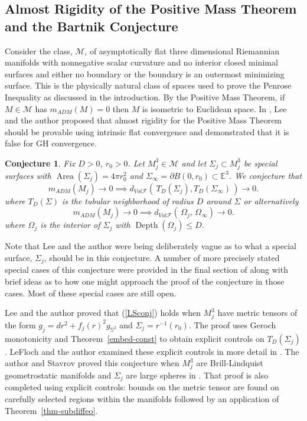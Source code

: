 \documentclass[12pt]{amsart}
\newtheorem{conj}[thm]{Conjecture}
\begin{document}
\subsection{Almost Rigidity of the Positive Mass Theorem
and the Bartnik Conjecture}\label{sect-PMT}

Consider the class, $\mathcal{M}$, of asymptotically flat
three dimensional Riemannian manifolds with nonnegative
scalar curvature and no interior closed minimal surfaces
and either no boundary or the boundary is an outermost
minimizing surface.   This is the physically natural class of
spaces used to prove the Penrose Inequality as discussed
in the introduction.  By the Positive Mass Theorem, if $M\in \mathcal{M}$
has $m_{ADM}(M)=0$ then $M$ is isometric to Euclidean space.
 In \cite{LeeSormani1}, Lee and the
author proposed that almost rigidity for the Positive Mass Theorem
should be provable using intrinsic flat convergence and demonstrated
that it is false for GH convergence. 

\begin{conj}\label{conj-PMT}   
Fix $D>0$, $r_0>0$.
Let $M_j^3 \in \mathcal{M}$ and let $\Sigma_j\subset M_j^3$ be
special surfaces with ${\operatorname{Area}}(\Sigma_j)=4\pi r_0^2$
and $\Sigma_\infty=\partial B(0, r_0)\subset {\mathbb{E}}^3$.  
We conjecture that
\begin{equation}\label{LSconj}
m_{ADM}(M_j) \to 0 \implies d_{Vol\mathcal{F}}\left(\,T_D(\Sigma_j), T_D(\Sigma_\infty)\,\right)\to 0.
\end{equation}
 where  
$T_D(\Sigma)$ is the 
tubular neighborhood of radius $D$ around $\Sigma$ or alternatively 
\begin{equation}\label{HLSconj}
m_{ADM}(M_j) \to 0 \implies d_{Vol\mathcal{F}}\left(\,\Omega_j,\,\Omega_\infty\right)\to 0.
\end{equation}
where $\Omega_j$ is the interior of $\Sigma_j$
with ${\operatorname{Depth}}(\Omega_j)\le D$.  
 \end{conj}
 

 Note that Lee and
 the author were being deliberately vague as to what a special
 surface, $\Sigma_j$, should be in this conjecture.  A number of more precisely 
stated special cases of this 
conjecture were provided in the final section of \cite{LeeSormani1}  
along with brief ideas as to how
one might approach the proof of the conjecture in those cases.
Most of these special cases are still open.

 Lee and the author proved that (\ref{LSconj}) holds
 when $M_j^3$ have metric tensors
 of the form $g_j=dr^2 + f_j(r)^2 g_{{\mathbb{S}}^2}$
and $\Sigma_j=r^{-1}(r_0)$.   The proof uses 
Geroch monotonicity and Theorem~\ref{embed-const}
to obtain explicit controls on $T_D(\Sigma_j)$\cite{LeeSormani1}.
LeFloch and the author examined these explicit controls in more
detail in \cite{LeFloch-Sormani-1}.  The author and Stavrov
proved this conjecture when $M_j^3$ are Brill-Lindquist geometrostatic 
manifolds and $\Sigma_j$ are large spheres in \cite{Sormani-Stavrov-1}.  
That proof is also completed using explicit controls: 
bounds on the metric tensor are found on carefully selected regions 
within the manifolds followed by an application of Theorem~\ref{thm-subdiffeo}.
\end{document}
